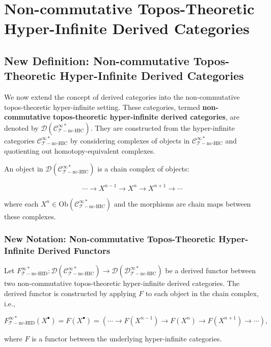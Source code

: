 \documentclass{article}
\begin{document}

\section{Non-commutative Topos-Theoretic Hyper-Infinite Derived Categories}
\subsection{New Definition: Non-commutative Topos-Theoretic Hyper-Infinite Derived Categories}
We now extend the concept of derived categories into the non-commutative topos-theoretic hyper-infinite setting. These categories, termed \textbf{non-commutative topos-theoretic hyper-infinite derived categories}, are denoted by \(\mathcal{D}(\mathcal{C}_{\mathcal{T}-\text{nc-HIC}}^{\infty *})\). They are constructed from the hyper-infinite categories \(\mathcal{C}_{\mathcal{T}-\text{nc-HIC}}^{\infty *}\) by considering complexes of objects in \(\mathcal{C}_{\mathcal{T}-\text{nc-HIC}}^{\infty *}\) and quotienting out homotopy-equivalent complexes.

An object in \(\mathcal{D}(\mathcal{C}_{\mathcal{T}-\text{nc-HIC}}^{\infty *})\) is a chain complex of objects:

\[
\cdots \to X^{n-1} \to X^n \to X^{n+1} \to \cdots
\]

where each \(X^n \in \text{Ob}(\mathcal{C}_{\mathcal{T}-\text{nc-HIC}}^{\infty *})\) and the morphisms are chain maps between these complexes.

\subsubsection{New Notation: Non-commutative Topos-Theoretic Hyper-Infinite Derived Functors}
Let \(F_{\mathcal{T}-\text{nc-HID}}^{\infty *}: \mathcal{D}(\mathcal{C}_{\mathcal{T}-\text{nc-HIC}}^{\infty *}) \to \mathcal{D}(\mathcal{D}_{\mathcal{T}-\text{nc-HIC}}^{\infty *})\) be a derived functor between two non-commutative topos-theoretic hyper-infinite derived categories. The derived functor is constructed by applying \(F\) to each object in the chain complex, i.e.,

\[
F_{\mathcal{T}-\text{nc-HID}}^{\infty *}(X^{\bullet}) = F(X^{\bullet}) = \left( \cdots \to F(X^{n-1}) \to F(X^n) \to F(X^{n+1}) \to \cdots \right),
\]

where \(F\) is a functor between the underlying hyper-infinite categories.
\end{document}
